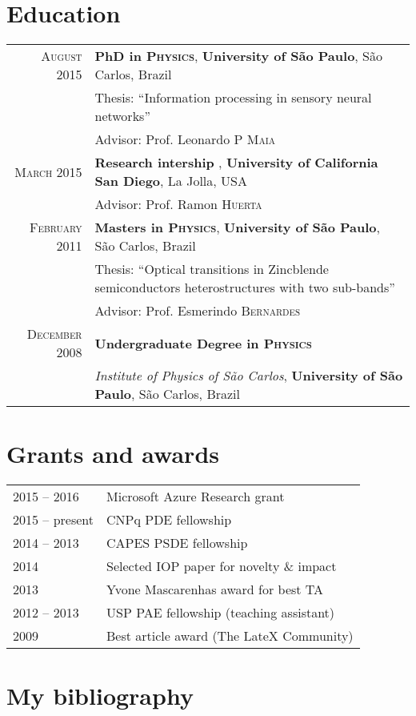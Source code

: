\documentclass[a4paper,10pt]{article} %
\begin{document}

\section{Education}

\begin{tabular}{rl}
  \textsc{August} 2015 & {\bf PhD in \textsc{Physics}}, \textbf{University of S\~ao Paulo}, S\~ao Carlos, Brazil\\
  & Thesis: ``Information processing in sensory neural networks'' \\
  & \small Advisor: Prof. Leonardo P \textsc{Maia}

  \vspace{0.2cm}
  \\
  \textsc{March} 2015 & {\bf Research intership }, \textbf{University of California San Diego}, La Jolla, USA\\
  & \small Advisor: Prof. Ramon \textsc{Huerta}

  \vspace{0.2cm}
  \\
  \textsc{February} 2011 & {\bf Masters in \textsc{Physics}}, \textbf{University of S\~ao Paulo}, S\~ao Carlos, Brazil\\
  & Thesis: ``Optical transitions in Zincblende semiconductors heterostructures with two sub-bands'' \\
  & \small Advisor: Prof. Esmerindo \textsc{Bernardes}

  \vspace{0.2cm}
  \\
  \textsc{December} 2008 & {\bf Undergraduate Degree in \textsc{}\textsc{Physics}} \\
  & \small\emph{Institute of Physics of S\~ao Carlos}, \normalsize\textbf{University of S\~ao Paulo}, S\~ao Carlos, Brazil

\end{tabular}

\section{Grants and awards}

\begin{tabular}{ll}
  2015 -- 2016  & Microsoft Azure Research grant\\
  2015 -- present  & CNPq PDE fellowship\\
  2014 -- 2013   & CAPES PSDE fellowship\\
  2014   & Selected IOP paper for novelty \& impact\\
  2013   & Yvone Mascarenhas award for best TA \\
  2012 -- 2013 & USP PAE fellowship (teaching assistant) \\
  2009   & Best article award (The LateX Community)
\end{tabular}


\section{My bibliography}

\nocite{*}

\printbibliography[omitnumbers=true, type=article]

\printbibliography[omitnumbers=true, type=inproceedings]
\end{document}
